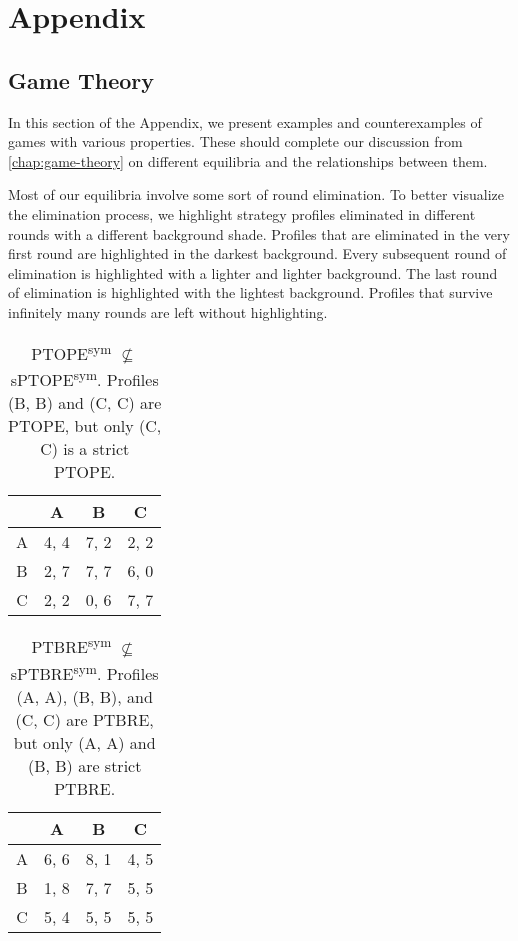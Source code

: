 \chapter{Appendix}

\section{Game Theory}
In this section of the Appendix, we present examples and counterexamples of games with various properties.
These should complete our discussion from \autoref{chap:game-theory} on different equilibria and the relationships between them.

Most of our equilibria involve some sort of round elimination.
To better visualize the elimination process, we highlight strategy profiles eliminated in different rounds with a different background shade.
Profiles that are eliminated in the very first round are highlighted in the \colorbox{gray!80}{darkest} background.
Every subsequent round of elimination is highlighted with a \colorbox{gray!60}{lighter} and \colorbox{gray!40}{lighter} background.
The last round of elimination is highlighted with the \colorbox{gray!20}{lightest} background.
Profiles that survive infinitely many rounds are left without highlighting.

\begin{table}
	\caption{
		PTOPE\textsuperscript{sym} $\not\subseteq$ sPTOPE\textsuperscript{sym}.
		Profiles (B, B) and (C, C) are PTOPE, but only (C, C) is a strict PTOPE.
	}
	\label{tab:ptope-not-sub-sptope}
	\centering
	\begin{tabular}{|c|c|c|c|}
		\hline
			& A		& B	   & C	  \\
		\hline
		A 		&\cellcolor{gray!00} 4, 4 &\cellcolor{gray!00} 7, 2 &\cellcolor{gray!00} 2, 2 \\
		\hline
		B		&\cellcolor{gray!00} 2, 7 &\cellcolor{gray!00} 7, 7 &\cellcolor{gray!70} 6, 0 \\
		\hline
		C		&\cellcolor{gray!00} 2, 2 &\cellcolor{gray!70} 0, 6 &\cellcolor{gray!00} 7, 7 \\
		\hline
	\end{tabular}
\end{table}

\begin{table}
	\caption{
		PTBRE\textsuperscript{sym} $\not\subseteq$ sPTBRE\textsuperscript{sym}.
		Profiles (A, A), (B, B), and (C, C) are PTBRE, but only (A, A) and (B, B) are strict PTBRE.
	}
	\label{tab:ptbre-not-sub-sptbre}
	\centering
	\begin{tabular}{|c|c|c|c|}
		\hline
			& A		& B	   & C	  \\
		\hline
		A 		&\cellcolor{gray!20} 6, 6 &\cellcolor{gray!70} 8, 1 &\cellcolor{gray!70} 4, 5 \\
		\hline
		B		&\cellcolor{gray!70} 1, 8 &\cellcolor{gray!00} 7, 7 &\cellcolor{gray!45} 5, 5 \\
		\hline
		C		&\cellcolor{gray!70} 5, 4 &\cellcolor{gray!45} 5, 5 &\cellcolor{gray!45} 5, 5 \\
		\hline
	\end{tabular}
\end{table}

